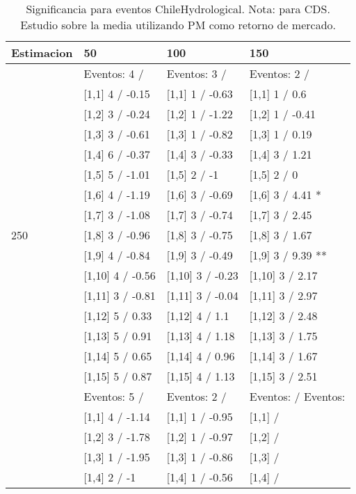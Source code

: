 \begin{table}

\caption{Significancia para eventos ChileHydrological. Nota: para CDS. Estudio sobre la media utilizando PM como retorno de mercado.}
\centering
\begin{tabular}[t]{llll}
\toprule
Estimacion & 50 & 100 & 150\\
\midrule
 & Eventos:  4 / & Eventos:  3 / & Eventos:  2 /\\
 & {}[1,1] 4  / -0.15 & {}[1,1] 1  / -0.63 & {}[1,1] 1  / 0.6\\
 & {}[1,2] 3  / -0.24 & {}[1,2] 1  / -1.22 & {}[1,2] 1  / -0.41\\
 & {}[1,3] 3  / -0.61 & {}[1,3] 1  / -0.82 & {}[1,3] 1  / 0.19\\
 & {}[1,4] 6  / -0.37 & {}[1,4] 3  / -0.33 & {}[1,4] 3  / 1.21\\
\addlinespace
 & {}[1,5] 5  / -1.01 & {}[1,5] 2  / -1 & {}[1,5] 2  / 0\\
 & {}[1,6] 4  / -1.19 & {}[1,6] 3  / -0.69 & {}[1,6] 3  / 4.41 *\\
 & {}[1,7] 3  / -1.08 & {}[1,7] 3  / -0.74 & {}[1,7] 3  / 2.45\\
250 & {}[1,8] 3  / -0.96 & {}[1,8] 3  / -0.75 & {}[1,8] 3  / 1.67\\
 & {}[1,9] 4  / -0.84 & {}[1,9] 3  / -0.49 & {}[1,9] 3  / 9.39 **\\
\addlinespace
 & {}[1,10] 4  / -0.56 & {}[1,10] 3  / -0.23 & {}[1,10] 3  / 2.17\\
 & {}[1,11] 3  / -0.81 & {}[1,11] 3  / -0.04 & {}[1,11] 3  / 2.97\\
 & {}[1,12] 5  / 0.33 & {}[1,12] 4  / 1.1 & {}[1,12] 3  / 2.48\\
 & {}[1,13] 5  / 0.91 & {}[1,13] 4  / 1.18 & {}[1,13] 3  / 1.75\\
 & {}[1,14] 5  / 0.65 & {}[1,14] 4  / 0.96 & {}[1,14] 3  / 1.67\\
\addlinespace
 & {}[1,15] 5  / 0.87 & {}[1,15] 4  / 1.13 & {}[1,15] 3  / 2.51\\
 & Eventos:  5 / & Eventos:  2 / & Eventos:   / Eventos:\\
 & {}[1,1] 4  / -1.14 & {}[1,1] 1  / -0.95 & {}[1,1]  /\\
 & {}[1,2] 3  / -1.78 & {}[1,2] 1  / -0.97 & {}[1,2]  /\\
 & {}[1,3] 1  / -1.95 & {}[1,3] 1  / -0.86 & {}[1,3]  /\\
\addlinespace
 & {}[1,4] 2  / -1 & {}[1,4] 1  / -0.56 & {}[1,4]  /\\

\end{tabular}
\end{table}
